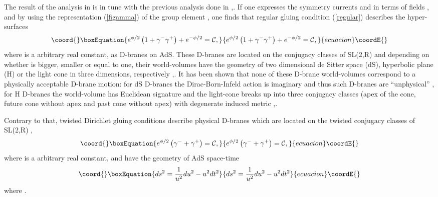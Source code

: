\documentclass[a4paper,12pt]{article}
\begin{document}
The result of the analysis in \cite{lomholt} is in tune with the previous
analysis done in \cite{stanciu},\cite{bachas}. If one expresses the symmetry
currents \coordHE{} and \coordHE{}
in terms of fields \coordHE{}, \coordHE{} and \coordHE{} by using the
representation (\ref{figamma}) of the group element \coordHE{}, one finds that
regular gluing condition (\ref{regular}) describes the hyper-surfaces
\begin{equation}\coord{}\boxEquation{
e^{\phi /2}\left( 1+\gamma ^{-}\gamma ^{+}\right) +e^{-\phi /2}=\mathcal{C},
\label{regularD}
}{
e^{\phi /2}\left( 1+\gamma ^{-}\gamma ^{+}\right) +e^{-\phi /2}=\mathcal{C},
}{ecuacion}\coordE{}\end{equation}
where \coordHE{} is a arbitrary real constant, as D-branes on AdS\coordHE{}.
These D-branes are located on the conjugacy classes of SL(2,R) and depending
on whether \coordHE{} is bigger, smaller or equal to one,
their world-volumes have the geometry of two dimensional de Sitter space (dS\coordHE{}), hyperbolic plane (H\coordHE{}) or the light cone in three dimensions,
respectively \cite{stanciu},\cite{bachas}. It has been shown that none of
these D-brane world-volumes correspond to a physically acceptable D-brane
motion: for dS\coordHE{} D-branes the Dirac-Born-Infeld action is imaginary and
thus such D-branes are ``unphysical'' \cite{bachas}, for H\coordHE{} D-branes
the world-volume has Euclidean signature and the light-cone breaks up into
three conjugacy classes (apex of the cone, future cone without apex and past
cone without apex) with degenerate induced metric \cite{stanciu},\cite
{bachas}.

Contrary to that, twisted Dirichlet gluing conditions describe physical
D-branes \cite{bachas} which are located on the twisted conjugacy classes of
SL(2,R) \cite{bachas},\cite{lomholt}
\begin{equation}\coord{}\boxEquation{
e^{\phi /2}\left( \gamma ^{-}+\gamma ^{+}\right) =\mathcal{C},
\label{twistedD}
}{
e^{\phi /2}\left( \gamma ^{-}+\gamma ^{+}\right) =\mathcal{C},
}{ecuacion}\coordE{}\end{equation}
where \coordHE{} is a arbitrary real constant, and have the geometry of
AdS\coordHE{} space-time
\begin{equation}\coord{}\boxEquation{
ds^{2}=\frac{1}{u^{2}}du^{2}-u^{2}dt^{2}  \label{ads2}
}{
ds^{2}=\frac{1}{u^{2}}du^{2}-u^{2}dt^{2}  }{ecuacion}\coordE{}\end{equation}
where \coordHE{}.
\end{document}
